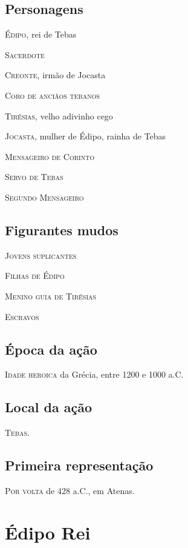 
\section{Personagens}

\textsc{Édipo,} rei de Tebas

\textsc{Sacerdote}

\textsc{Creonte,} irmão de Jocasta

\textsc{Coro de anciãos tebanos}

\textsc{Tirésias,} velho adivinho cego

\textsc{Jocasta,} mulher de Édipo, rainha de Tebas

\textsc{Mensageiro de Corinto}

\textsc{Servo de Tebas}

\textsc{Segundo Mensageiro}


\section{Figurantes mudos} 

\textsc{Jovens suplicantes} 

\textsc{Filhas de Édipo}

\textsc{Menino guia de Tirésias}

\textsc{Escravos}



\section{Época da ação} 

\textsc{Idade heroica} da Grécia, entre 1200 e 1000 a.C.

\section{Local da ação} 

\textsc{Tebas}.

\section{Primeira representação} 

\textsc{Por volta} de 428 a.C., em Atenas.


\clearpage

\chapter{Édipo Rei}

